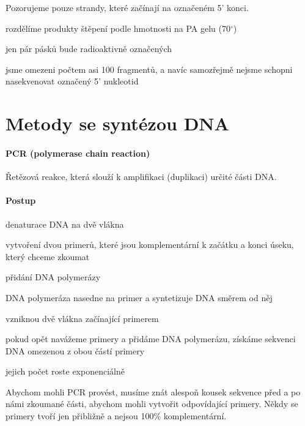 \documentclass[DIV=8]{scrreprt}
\newcommand{\mybox}[2]{
    \paragraph{#1} #2
}
\begin{document}
Pozorujeme pouze strandy, které začínají na označeném 5' konci.
\begin{myItemize}[nosep]
    \item rozdělíme produkty štěpení podle hmotnosti na PA gelu (70\(^{\circ}\))
\begin{myItemize}[nosep]
    \item jen pár pásků bude radioaktivně označených
\end{myItemize}

    \item jsme omezeni počtem asi 100 fragmentů, a navíc samozřejmě nejsme schopni nasekvenovat označený 5' nukleotid
\end{myItemize}



\section{Metody se syntézou DNA} \label{Metody se syntézou DNA} \FloatBarrier


\mybox{PCR (polymerase chain reaction)}{Řetězová reakce, která slouží k amplifikaci (duplikaci) určité části DNA.

\paragraph{Postup}
\begin{myEnumerate}[nosep]
    \item denaturace DNA na dvě vlákna
    \item vytvoření dvou primerů, které jsou komplementární k začátku a konci úseku, který chceme zkoumat
    \item přidání DNA polymerázy
    \item DNA polymeráza nasedne na primer a syntetizuje DNA směrem od něj
    \item vzniknou dvě vlákna začínající primerem
    \item pokud opět navážeme primery a přidáme DNA polymerázu, získáme sekvenci DNA omezenou z obou částí primery
\begin{myItemize}[nosep]
    \item jejich počet roste exponenciálně
\end{myItemize}

\end{myEnumerate}



Abychom mohli PCR provést, musíme znát alespoň kousek sekvence před a po námi zkoumané části, abychom mohli vytvořit odpovídající primery. Někdy se primery tvoří jen přibližně a nejsou 100\% komplementární.}
\end{document}
